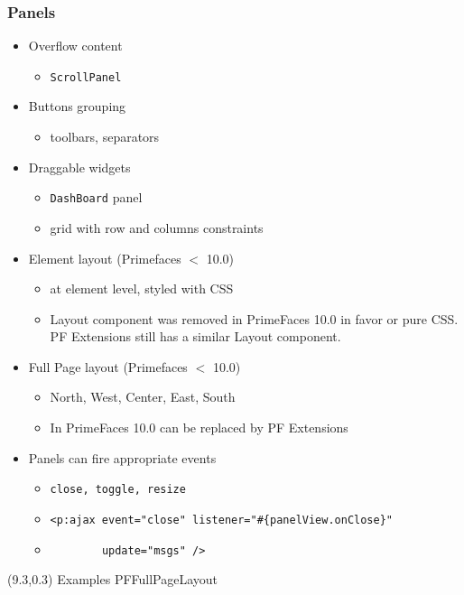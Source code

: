 \documentclass[10pt,xcolor=pdflatex]{beamer}
\begin{document}
\begin{frame}[fragile]\frametitle{Panels}
  \begin{itemize}
    \item Overflow content
	  \begin{itemize}
		\item \texttt{ScrollPanel}
	  \end{itemize}
    \item Buttons grouping
      \begin{itemize}
    	\item toolbars, separators
      \end{itemize}
    \item Draggable widgets
	  \begin{itemize}
		\item \texttt{DashBoard} panel
		\item grid with row and columns constraints
	  \end{itemize}
    \item Element layout (Primefaces $<$ 10.0)
      \begin{itemize}
        \item at element level, styled with CSS
        \item Layout component was removed in PrimeFaces 10.0 in favor or pure CSS. PF Extensions still has a similar Layout component.
      \end{itemize}
    \item Full Page layout (Primefaces $<$ 10.0)
	  \begin{itemize}
		\item North, West, Center, East, South
		\item In PrimeFaces 10.0 can be replaced by PF Extensions
	  \end{itemize}
	\item Panels can fire appropriate events
      \begin{itemize}
    	\item \texttt{close, toggle, resize}
        \item[] \verb;<p:ajax event="close" listener="#{panelView.onClose}" ;
        \item[] \verb;        update="msgs" />;
      \end{itemize}
  \end{itemize}
\begin{textblock}{10}(9.3,0.3)
    {\footnotesize Examples PFFullPageLayout}
\end{textblock}
\end{frame}
\end{document}
